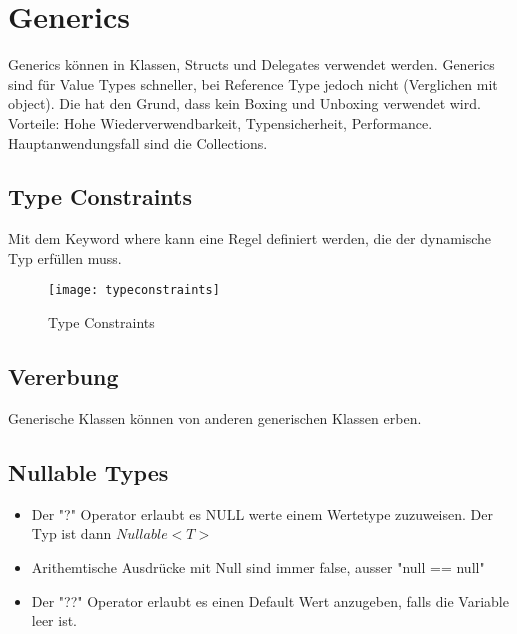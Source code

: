 \section{Generics}
Generics können in Klassen, Structs und Delegates verwendet werden. Generics sind für Value Types schneller, bei Reference Type jedoch nicht (Verglichen mit object). Die hat den Grund, dass kein Boxing und Unboxing verwendet wird. Vorteile: Hohe Wiederverwendbarkeit, Typensicherheit, Performance. Hauptanwendungsfall sind die Collections.

\subsection{Type Constraints}
Mit dem Keyword where kann eine Regel definiert werden, die der dynamische Typ erfüllen muss.
\begin{figure}[h!]
	\centering
  	\texttt{[image: typeconstraints]}
    \caption{Type Constraints}
\end{figure}

\subsection{Vererbung}
 Generische Klassen können von anderen generischen Klassen erben. 
 
 \subsection{Nullable Types}
 \begin{itemize}
  \itemsep -0.5em 
  \item Der "?" Operator erlaubt es NULL werte einem Wertetype zuzuweisen. Der Typ ist dann $Nullable<T>$
  \item Arithemtische Ausdrücke mit Null sind immer false, ausser "null == null"
  \item Der "??" Operator erlaubt es einen Default Wert anzugeben, falls die Variable leer ist.
\end{itemize}
